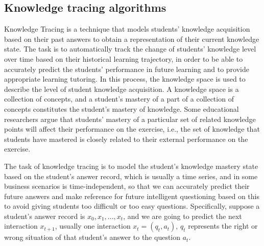 \subsection{Knowledge tracing algorithms}
Knowledge Tracing is a technique that models students' knowledge acquisition based on their past answers to obtain a representation of their current knowledge state. The task is to automatically track the change of students' knowledge level over time based on their historical learning trajectory, in order to be able to accurately predict the students' performance in future learning and to provide appropriate learning tutoring. In this process, the knowledge space is used to describe the level of student knowledge acquisition. A knowledge space is a collection of concepts, and a student's mastery of a part of a collection of concepts constitutes the student's mastery of knowledge. Some educational researchers argue that students' mastery of a particular set of related knowledge points will affect their performance on the exercise, i.e., the set of knowledge that students have mastered is closely related to their external performance on the exercise.

The task of knowledge tracing is to model the student's knowledge mastery state based on the student's answer record, which is usually a time series, and in some business scenarios is time-independent, so that we can accurately predict their future answers and make reference for future intelligent questioning based on this to avoid giving students too difficult or too easy questions. Specifically, suppose a student's answer record is $x_0,x_1,...,x_t$, and we are going to predict the next interaction $x_{t+1}$, usually one interaction $x_t=(q_t,a_t)$, $q_t$ represents the right or wrong situation of that student's answer to the question $a_t$.

